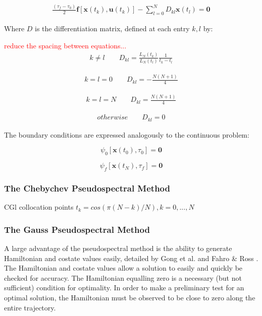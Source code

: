 \begin{eqnarray}
\frac{(\tau_f - \tau_0)}{2}\textbf{f}[\textbf{x}(t_k),\textbf{u}(t_k)] - \sum_{l=0}^{N} D_{kl} \textbf{x}(t_l) = \textbf{0}
\end{eqnarray}

Where $D$ is the differentiation matrix, defined at each entry $k,l$ by:

\textcolor{red}{reduce the spacing between equations...}
\begin{eqnarray}
k \neq l\qquad
D_{kl} = \frac{L_N(t_k)}{L_N(t_l)} \frac{1}{t_k - t_l}
\end{eqnarray}

\begin{eqnarray}
k = l = 0\qquad
D_{kl} = - \frac{N(N+1)}{4} 
\end{eqnarray}

\begin{eqnarray}
k = l = N\qquad
D_{kl} = \frac{N(N+1)}{4} 
\end{eqnarray}

\begin{eqnarray}
otherwise \qquad
D_{kl} = 0
\end{eqnarray}

The boundary conditions are expressed analogously to the continuous problem:

\begin{equation}
\psi_0[\textbf{x}(t_0), \tau_0] = \textbf{0}
\end{equation}

\begin{equation}
\psi_f[\textbf{x}(t_N), \tau_f] = \textbf{0}
\end{equation}


\subsubsection{The Chebychev Pseudospectral Method}

CGl collocation points \cite{Gong2010}
$t_k = cos(\pi (N-k)/N), k=0,...,N$



\subsubsection{The Gauss Pseudospectral Method}


A large advantage of the pseudospectral method is the ability to generate Hamiltonian and costate values easily, detailed by Gong et al. \cite{Gong2010} and Fahro \& Ross \cite{Fahroo2001}. The Hamiltonian and costate values allow a solution to easily and quickly be checked for accuracy.  The Hamiltonian equalling zero is a necessary (but not sufficient) condition for optimality. In order to make a preliminary test for an optimal solution, the Hamiltonian must be observed to be close to zero along the entire trajectory. 


